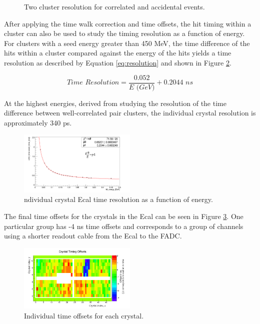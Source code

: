 \documentclass[twoside]{article}
\begin{document}
\begin{multicols}{2}
\begin{figure}[H]
  \caption{Two cluster resolution for correlated and accidental events.}
  \label{fig:money}
\end{figure}
After applying the time walk correction and time offsets, the hit timing within a cluster can also be used to study the timing resolution as a function of energy. For clusters with a seed energy greater than 450 MeV, the time difference of the hits within a cluster compared against the energy of the hits yields a time resolution as described by Equation \ref{eq:resolution} and shown in Figure \ref{fig:tresolution}.

\begin{equation}
\label{eq:resolution}
\textit{Time Resolution} = \dfrac{0.052}{E \textit{ (GeV)}}+0.2044 \textit{ ns}
\end{equation}

At the highest energies, derived from studying the resolution of the time difference between well-correlated pair clusters, the individual crystal resolution is approximately 340 ps.\\  
 \begin{figure}[H]
  \centering
      \includegraphics[width=0.5\textwidth]{tres1.png}
  \caption{ndividual crystal Ecal time resolution as a function of energy.}
\label{fig:tresolution}
\end{figure}

The final time offsets for the crystals in the Ecal can be seen in Figure \ref{fig:ecalOffsets}. One particular group has -4 ns time offsets and corresponds to a group of channels using a shorter readout cable from the Ecal to the FADC.  
 \begin{figure}[H]
  \centering
      \includegraphics[width=0.5\textwidth]{ecalOffsets.png}
  \caption{Individual time offsets for each crystal.}
\label{fig:ecalOffsets}
\end{figure}



\end{multicols}
\end{document}
